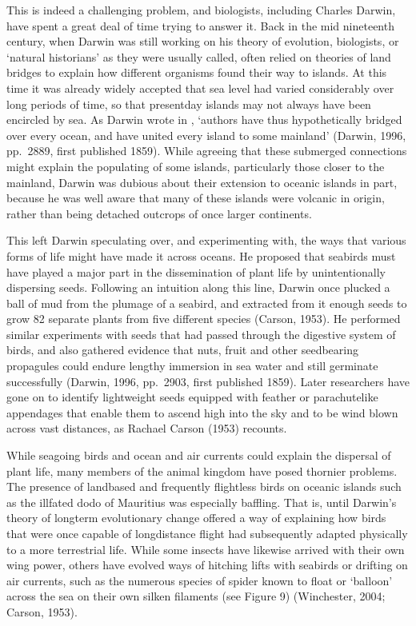 \documentclass[letterpaper,10pt,english]{sphinxmanual}
\begin{document}
This is indeed a challenging problem, and biologists, including Charles Darwin, have spent a great deal of time trying to answer it. Back in the mid nineteenth century, when Darwin was still working on his theory of evolution, biologists, or ‘natural historians’ as they were usually called, often relied on theories of land bridges to explain how different organisms found their way to islands. At this time it was already widely accepted that sea level had varied considerably over long periods of
time, so that present\sphinxhyphen{}day islands may not always have been encircled by sea. As Darwin wrote in , ‘authors have thus hypothetically bridged over every ocean, and have united every island to some mainland’ (Darwin, 1996, pp. 288\textendash{}9, first published 1859). While agreeing that these submerged connections might explain the populating of some islands, particularly those closer to the mainland, Darwin was dubious about their extension to oceanic islands \textendash{} in part, because he was
well aware that many of these islands were volcanic in origin, rather than being detached outcrops of once larger continents.

This left Darwin speculating over, and experimenting with, the ways that various forms of life might have made it across oceans. He proposed that seabirds must have played a major part in the dissemination of plant life by unintentionally dispersing seeds. Following an intuition along this line, Darwin once plucked a ball of mud from the plumage of a seabird, and extracted from it enough seeds to grow 82 separate plants from five different species (Carson, 1953). He performed similar experiments
with seeds that had passed through the digestive system of birds, and also gathered evidence that nuts, fruit and other seed\sphinxhyphen{}bearing propagules could endure lengthy immersion in sea water and still germinate successfully (Darwin, 1996, pp. 290\textendash{}3, first published 1859). Later researchers have gone on to identify lightweight seeds equipped with feather\sphinxhyphen{} or parachute\sphinxhyphen{}like appendages that enable them to ascend high into the sky and to be wind blown across vast distances, as Rachael Carson (1953)
recounts.

While sea\sphinxhyphen{}going birds and ocean and air currents could explain the dispersal of plant life, many members of the animal kingdom have posed thornier problems. The presence of land\sphinxhyphen{}based and frequently flightless birds on oceanic islands \textendash{} such as the ill\sphinxhyphen{}fated dodo of Mauritius \textendash{} was especially baffling. That is, until Darwin’s theory of long\sphinxhyphen{}term evolutionary change offered a way of explaining how birds that were once capable of long\sphinxhyphen{}distance flight had subsequently adapted physically to a more
terrestrial life. While some insects have likewise arrived with their own wing power, others have evolved ways of hitching lifts with seabirds or drifting on air currents, such as the numerous species of spider known to float or ‘balloon’ across the sea on their own silken filaments (see Figure 9) (Winchester, 2004; Carson, 1953).
\end{document}
